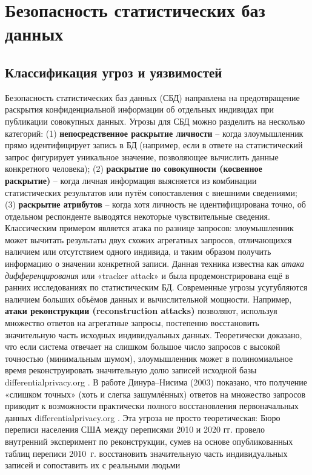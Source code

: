 \section{Безопасность статистических баз данных} \subsection{Классификация угроз и уязвимостей}
Безопасность статистических баз данных (СБД) направлена на предотвращение раскрытия конфиденциальной информации об отдельных индивидах при публикации совокупных данных. Угрозы для СБД можно разделить на несколько категорий: (1) \textbf{непосредственное раскрытие личности} – когда злоумышленник прямо идентифицирует запись в БД (например, если в ответе на статистический запрос фигурирует уникальное значение, позволяющее вычислить данные конкретного человека); (2) \textbf{раскрытие по совокупности (косвенное раскрытие)} – когда личная информация выясняется из комбинации статистических результатов или путём сопоставления с внешними сведениями; (3) \textbf{раскрытие атрибутов} – когда хотя личность не идентифицирована точно, об отдельном респонденте выводятся некоторые чувствительные сведения. Классическим примером является атака по разнице запросов: злоумышленник может вычитать результаты двух схожих агрегатных запросов, отличающихся наличием или отсутствием одного индивида, и таким образом получить информацию о значении конкретной записи. Данная техника известна как \textit{атака дифференцирования} или «tracker attack» и была продемонстрирована ещё в ранних исследованиях по статистическим БД. Современные угрозы усугубляются наличием больших объёмов данных и вычислительной мощности. Например, \textbf{атаки реконструкции (reconstruction attacks)} позволяют, используя множество ответов на агрегатные запросы, постепенно восстановить значительную часть исходных индивидуальных данных. Теоретически доказано, что если система отвечает на слишком большое число запросов с высокой точностью (минимальным шумом), злоумышленник может в полиномиальное время реконструировать значительную долю записей исходной базы
differentialprivacy.org
. В работе Динура–Нисима (2003) показано, что получение «слишком точных» (хоть и слегка зашумлённых) ответов на множество запросов приводит к возможности практически полного восстановления первоначальных данных
differentialprivacy.org
. Эта угроза не просто теоретическая: Бюро переписи населения США между переписями 2010 и 2020 гг. провело внутренний эксперимент по реконструкции, сумев на основе опубликованных таблиц переписи 2010~г. восстановить значительную часть индивидуальных записей и сопоставить их с реальными людьми
